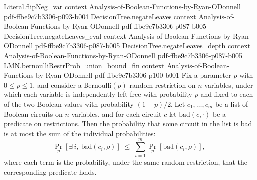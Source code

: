 \begin{lemma}
  {Literal.flipNeg_var}
  {context}
  {Analysis-of-Boolean-Functions-by-Ryan-ODonnell}
  {pdf-ffbe9c7b3306-p093-b004}
\proofstep
  {DecisionTree.negateLeaves}
  {context}
  {Analysis-of-Boolean-Functions-by-Ryan-ODonnell}
  {pdf-ffbe9c7b3306-p087-b005}
\proofstep
  {DecisionTree.negateLeaves_eval}
  {context}
  {Analysis-of-Boolean-Functions-by-Ryan-ODonnell}
  {pdf-ffbe9c7b3306-p087-b005}
\proofstep
  {DecisionTree.negateLeaves_depth}
  {context}
  {Analysis-of-Boolean-Functions-by-Ryan-ODonnell}
  {pdf-ffbe9c7b3306-p087-b005}
\proofstep
  {LMN.bernoulliRestrProb_union_bound_fin}
  {context}
  {Analysis-of-Boolean-Functions-by-Ryan-ODonnell}
  {pdf-ffbe9c7b3306-p100-b001}
Fix a parameter $p$ with $0 \le p \le 1$, and consider a Bernoulli$(p)$ random
restriction on $n$ variables, under which each variable is independently left free with
probability $p$ and fixed to each of the two Boolean values with probability $(1-p)/2$.
Let $c_1, \dots, c_m$ be a list of Boolean circuits on $n$ variables, and for each
circuit $c$ let $\mathrm{bad}(c, \cdot)$ be a predicate on restrictions. Then the
probability that some circuit in the list is bad is at most the sum of the individual
probabilities:
\[
\Pr_p\!\left[\exists\, i,\ \mathrm{bad}(c_i, \rho)\right] \;\le\; \sum_{i=1}^{m}
\Pr_p\!\left[\mathrm{bad}(c_i, \rho)\right],
\]
where each term is the probability, under the same random restriction, that the
corresponding predicate holds.
\end{lemma}

